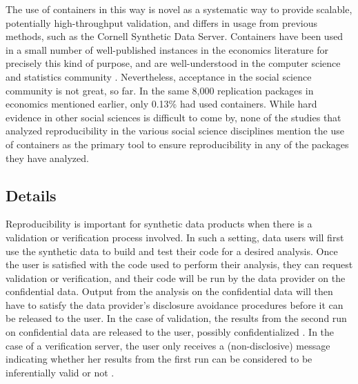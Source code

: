 \documentclass[]{hdsr}
\begin{document}
The use of containers in this way is novel as a systematic way to provide scalable, potentially high-throughput validation, and differs in usage from previous methods, such as the Cornell Synthetic Data Server. Containers have been used in a small number of well-published instances in the economics literature for precisely this kind of purpose, and are well-understood in the computer science and statistics community \citep{boettiger_introduction_2015,moreau_containers_2023}. Nevertheless, acceptance in the social science community  is not great, so far. In the same 8,000 replication packages in economics mentioned earlier, only 0.13\% had used containers. While hard evidence in other social sciences is difficult to come by, none of the studies that analyzed reproducibility in the various social science disciplines mention the use of containers as the primary tool to ensure reproducibility in any of the packages they have analyzed.

\subsection{Details}


Reproducibility is important for synthetic data products when there
is a validation or verification process involved. In such a setting, data users will first use the synthetic
data to build and test their code for a desired analysis. Once the user is satisfied with the code used to
perform their analysis, they can request validation or verification, and their code will be run by the data provider on the confidential data. Output from the analysis on the confidential data will then have to satisfy the data provider's disclosure avoidance procedures before it can be released to the user. In the case of validation, the results from the second run on confidential data are released to the user, possibly confidentialized \citep{u.s.censusbureauSIPPSyntheticBeta2015b}. In the case of a verification server, the user only receives a (non-disclosive) message indicating whether her results from the first run can be considered to be inferentially valid or not \citep{barrientos_providing_2018}.
\end{document}
